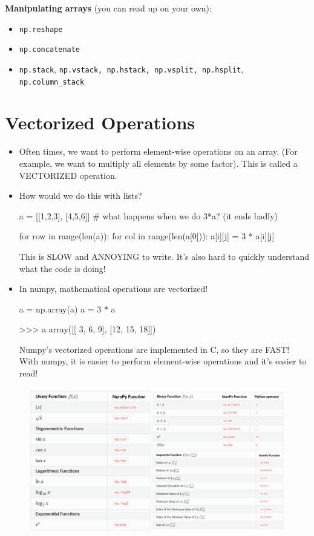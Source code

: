 \documentclass[12pt]{article}
\numberwithin{equation}{section}
\begin{document}
\textbf{Manipulating arrays} (you can read up on your own):
\begin{itemize}
    \item \verb|np.reshape|
    \item \verb|np.concatenate|
    \item \verb|np.stack|, \verb|np.vstack, np.hstack, np.vsplit, np.hsplit|, \verb|np.column_stack|
\end{itemize}

\section{Vectorized Operations}
\begin{itemize}
    \item Often times, we want to perform element-wise operations on an array. (For example, we want to multiply all elements by some factor). This is called a VECTORIZED operation.
    \item How would we do this with lists?
    \begin{python}
    a = [[1,2,3], [4,5,6]]
    # what happens when we do 3*a? (it ends badly)
    
    for row in range(len(a)):
        for col in range(len(a[0])):
            a[i][j] = 3 * a[i][j]
    \end{python}
    This is SLOW and ANNOYING to write. It's also hard to quickly understand what the code is doing!
    \item In numpy, mathematical operations are vectorized!
    \begin{python}
    a = np.array(a)
    a = 3 * a
    
    >>> a
    array([[ 3,  6,  9],
           [12, 15, 18]])
    \end{python}
    Numpy's vectorized operations are implemented in C, so they are FAST! With numpy, it is easier to perform element-wise operations and it's easier to read!
\end{itemize}
\begin{figure}[H]
	\centering
	\includegraphics[width=16.5cm] {vector}
\end{figure}
\end{document}
